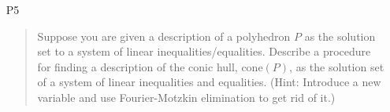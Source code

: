 \documentclass[12pt]{article}
\begin{document}
\begin{enumerate}

\item[P5]
\begin{quote}
Suppose you are given a description of a polyhedron $P$ as the solution set to a system of linear inequalities/equalities. Describe a procedure for finding a description of the conic hull, cone$(P)$, as the solution set of a system of linear inequalities and equalities. (Hint: Introduce a new variable and use Fourier-Motzkin elimination to get rid of it.)
\end{quote}


\end{enumerate}
\end{document}
